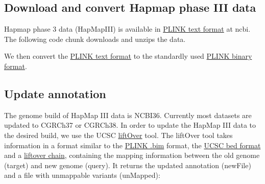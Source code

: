\documentclass[]{article}
\newenvironment{Shaded}{}{}
\newcommand{\FunctionTok}[1]{\textcolor[rgb]{0.02,0.16,0.49}{#1}}
\newcommand{\VariableTok}[1]{\textcolor[rgb]{0.10,0.09,0.49}{#1}}
\newcommand{\BuiltInTok}[1]{#1}
\newcommand{\ExtensionTok}[1]{#1}
\newcommand{\NormalTok}[1]{#1}
\begin{document}
\subsection{Download and convert Hapmap phase III
data}\label{download-and-convert-hapmap-phase-iii-data}

Hapmap phase 3 data (HapMapIII) is available in
\href{https://www.cog-genomics.org/plink/1.9/input\#ped}{PLINK text
format} at ncbi. The following code chunk downloads and unzips the data.

\begin{Shaded}
\end{Shaded}

We then convert the
\href{https://www.cog-genomics.org/plink/1.9/input\#ped}{PLINK text
format} to the standardly used
\href{https://www.cog-genomics.org/plink/1.9/inputbped}{PLINK binary
format}.

\begin{Shaded}
\end{Shaded}

\subsection{Update annotation}\label{update-annotation}

The genome build of HapMap III data is NCBI36. Currently most datasets
are updated to CGRCh37 or CGRCh38. In order to update the HapMap III
data to the desired build, we use the UCSC
\href{https://genome.ucsc.edu/cgi-bin/hgLiftOver}{liftOver} tool. The
liftOver tool takes information in a format similar to the
\href{https://www.cog-genomics.org/plink/1.9/formats\#bim}{PLINK .bim}
format, the
\href{https://genome.ucsc.edu/FAQ/FAQformat.html\#format1}{UCSC bed
format} and a
\href{http://hgdownload.soe.ucsc.edu/goldenPath/hg19/liftOver/}{liftover
chain}, containing the mapping information between the old genome
(target) and new genome (query). It returns the updated annotation
(newFile) and a file with unmappable variants (unMapped):
\end{document}
